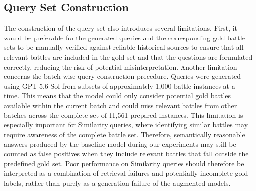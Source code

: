 \subsection{Query Set Construction}
The construction of the query set also introduces several limitations. First, it would be preferable for the generated queries and the corresponding gold battle sets to be manually verified against reliable historical sources to ensure that all relevant battles are included in the gold set and that the questions are formulated correctly, reducing the risk of potential misinterpretation. Another limitation concerns the batch-wise query construction procedure. Queries were generated using GPT-5.6 Sol from subsets of approximately 1,000 battle instances at a time. This means that the model could only consider potential gold battles available within the current batch and could miss relevant battles from other batches across the complete set of 11,561 prepared instances. This limitation is especially important for Similarity queries, where identifying similar battles may require awareness of the complete battle set. Therefore, semantically reasonable answers produced by the baseline model during our experiments may still be counted as false positives when they include relevant battles that fall outside the predefined gold set. Poor performance on Similarity queries should therefore be interpreted as a combination of retrieval failures and potentially incomplete gold labels, rather than purely as a generation failure of the augmented models.




